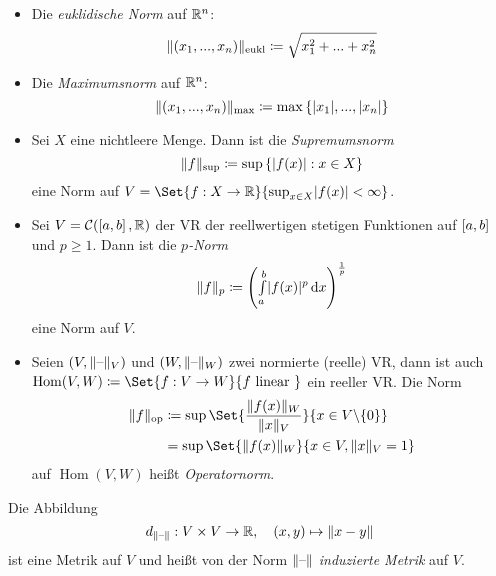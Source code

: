 \documentclass{cheat-sheet}
\DeclareMathOperator{\Hom}{Hom} %
\begin{document}
\begin{bem}
  \begin{itemize}
    \item Die \emph{euklidische Norm} auf $\mathbb{R}^n$:
    \[ \lVert(x_1, ..., x_n)\rVert_{\text{eukl}} \coloneqq \sqrt{x_1^2 + ... + x_n^2} \]
    \item Die \emph{Maximumsnorm} auf $\mathbb{R}^n$:
    \[ \lVert(x_1, ..., x_n)\rVert_{\text{max}} \coloneqq \max \left\{ \lvert x_1\rvert, ..., \lvert x_n\rvert \right\} \]
    \item Sei $X$ eine nichtleere Menge. Dann ist die \emph{Supremumsnorm}
    \[ \lVert f\rVert_{\text{sup}} \coloneqq \sup\left\{ \lvert f(x)\rvert : x \in X \right\} \]
    eine Norm auf $V = \Set{ f : X \to \R }{ \sup_{x \in X} \abs{f(x)} < \infty }$.
    \item Sei $V = \mathcal{C}(\left[ a, b \right], \mathbb{R})$ der VR der reellwertigen stetigen Funktionen auf $\left[ a, b \right]$ und $p \ge 1$. Dann ist die \emph{$p$-Norm}
    \[ \lVert f\rVert_{p} \coloneqq \left( {\textstyle \int\limits_{a}^{b}} \lvert f(x)\rvert^p \,\mathrm{d} x \right)^{\frac{1}{p}} \]
    eine Norm auf $V$.
    \item Seien $(V, \lVert\text{--}\rVert_V)$ und $(W, \lVert\text{--}\rVert_W)$ zwei normierte (reelle) VR, dann ist auch $\Hom(V, W) \coloneqq \Set{ f : V \to W }{ f \text{ linear } }$ ein reeller VR. Die Norm
    \begin{align*}
      \norm{f}_{\text{op}} &\coloneqq \sup \Set{ \frac{ \norm{f(x)}_W }{ \norm{x}_V } }{ x \in V \backslash \{ 0 \} }\\
        &= \sup \Set{ \norm{f(x)}_W }{ x \in V, \norm{x}_V = 1 }
    \end{align*}
    auf $\Hom(V, W)$ heißt \emph{Operatornorm}.
  \end{itemize}
\end{bem}


\begin{defn}
  Die Abbildung
  \[ d_{\lVert\text{--}\rVert} : V \times V \to \mathbb{R},\quad (x, y) \mapsto \lVert x - y\rVert \]
  ist eine Metrik auf $V$ und heißt von der Norm $\lVert\text{--}\rVert$ \emph{induzierte Metrik} auf $V$.
\end{defn}
\end{document}
